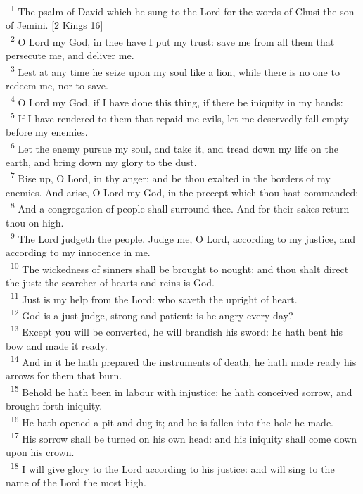 \documentclass[a5paper,12pt]{article}
\begin{document}
\begin{multicols*}{2}
~\textsuperscript{1} The psalm of David which he sung to the Lord for the words of Chusi the son of Jemini. [2 Kings 16]\\
~\textsuperscript{2} O Lord my God, in thee have I put my trust: save me from all them that persecute me, and deliver me.\\
~\textsuperscript{3} Lest at any time he seize upon my soul like a lion, while there is no one to redeem me, nor to save.\\
~\textsuperscript{4} O Lord my God, if I have done this thing, if there be iniquity in my hands:\\
~\textsuperscript{5} If I have rendered to them that repaid me evils, let me deservedly fall empty before my enemies.\\
~\textsuperscript{6} Let the enemy pursue my soul, and take it, and tread down my life on the earth, and bring down my glory to the dust.\\
~\textsuperscript{7} Rise up, O Lord, in thy anger: and be thou exalted in the borders of my enemies. And arise, O Lord my God, in the precept which thou hast commanded:\\
~\textsuperscript{8} And a congregation of people shall surround thee. And for their sakes return thou on high.\\
~\textsuperscript{9} The Lord judgeth the people. Judge me, O Lord, according to my justice, and according to my innocence in me.\\
~\textsuperscript{10} The wickedness of sinners shall be brought to nought: and thou shalt direct the just: the searcher of hearts and reins is God.\\
~\textsuperscript{11} Just is my help from the Lord: who saveth the upright of heart.\\
~\textsuperscript{12} God is a just judge, strong and patient: is he angry every day?\\
~\textsuperscript{13} Except you will be converted, he will brandish his sword: he hath bent his bow and made it ready.\\
~\textsuperscript{14} And in it he hath prepared the instruments of death, he hath made ready his arrows for them that burn.\\
~\textsuperscript{15} Behold he hath been in labour with injustice; he hath conceived sorrow, and brought forth iniquity.\\
~\textsuperscript{16} He hath opened a pit and dug it; and he is fallen into the hole he made.\\
~\textsuperscript{17} His sorrow shall be turned on his own head: and his iniquity shall come down upon his crown.\\
~\textsuperscript{18} I will give glory to the Lord according to his justice: and will sing to the name of the Lord the most high.\\


\end{multicols*}
\end{document}
